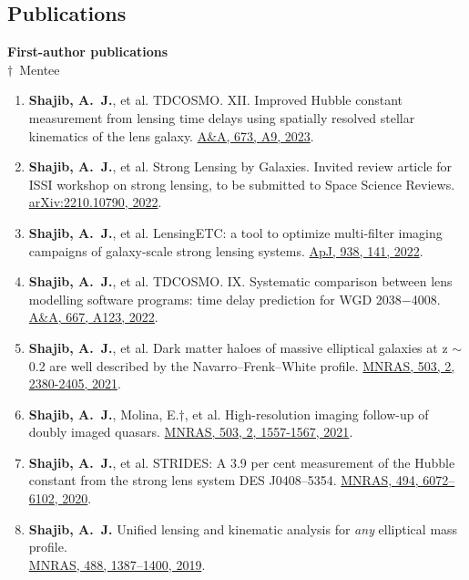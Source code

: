 \documentclass[margin, line]{res}
\begin{document}
\begin{resume}

\section{\sc Publications}
\textbf{First-author publications}
\newcommand{\mentee}{${\boldsymbol{\dagger}}$}
\\ \mentee\ Mentee
\begin{enumerate}
	\item \textbf{Shajib, A.~J.}, et al. TDCOSMO. XII. Improved Hubble constant measurement from lensing time delays using spatially resolved stellar kinematics of the lens galaxy. \href{https://ui.adsabs.harvard.edu/abs/2023arXiv230102656S/abstract}{A\&A, 673, A9, 2023}.
	\item \textbf{Shajib, A.~J.}, et al. Strong Lensing by Galaxies. Invited review article for ISSI workshop on strong lensing, to be submitted to Space Science Reviews. \href{https://arxiv.org/abs/2210.10790}{arXiv:2210.10790, 2022}.
	\item \textbf{Shajib, A.~J.}, et al. LensingETC: a tool to optimize multi-filter imaging campaigns of galaxy-scale strong lensing systems. \href{https://doi.org/10.3847/1538-4357/ac927b}{ApJ, 938, 141, 2022}.
	\item \textbf{Shajib, A.~J.}, et al. TDCOSMO. IX. Systematic comparison between lens modelling software programs: time delay prediction for WGD 2038$-$4008. \href{https://arxiv.org/abs/2202.11101}{A\&A, 667, A123, 2022}.
	\item \textbf{Shajib, A.~J.}, et al. Dark matter haloes of massive elliptical galaxies at z $\sim$ 0.2 are well described by the Navarro--Frenk--White profile. \href{https://doi.org/10.1093/mnras/stab536}{MNRAS, 503, 2, 2380-2405, 2021}.
	\item \textbf{Shajib, A.~J.}, Molina, E.{\mentee}, et al. High-resolution imaging follow-up of doubly imaged quasars. \href{https://doi:10.1093/mnras/stab532}{MNRAS, 503, 2, 1557-1567, 2021}.
	\item \textbf{Shajib, A.~J.}, et al. STRIDES: A 3.9 per cent measurement of the Hubble constant from the strong lens system DES J0408--5354. \href{https://academic.oup.com/mnras/advance-article-abstract/doi/10.1093/mnras/staa828/5813265}{MNRAS, 494, 6072--6102, 2020}.
	\item \textbf{Shajib, A.~J.} Unified lensing and kinematic analysis for \textit{any} elliptical mass profile. \\ \href{https://doi.org/10.1093/mnras/stz1796}{MNRAS, 488, 1387--1400, 2019}.

\end{enumerate}
\end{resume}
\end{document}
